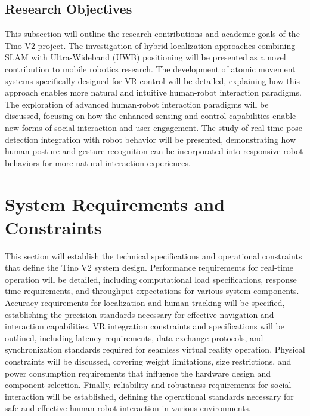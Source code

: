 \subsection{Research Objectives}
This subsection will outline the research contributions and academic goals of the Tino V2 project. The investigation of hybrid localization approaches combining SLAM with Ultra-Wideband (UWB) positioning will be presented as a novel contribution to mobile robotics research. The development of atomic movement systems specifically designed for VR control will be detailed, explaining how this approach enables more natural and intuitive human-robot interaction paradigms. The exploration of advanced human-robot interaction paradigms will be discussed, focusing on how the enhanced sensing and control capabilities enable new forms of social interaction and user engagement. The study of real-time pose detection integration with robot behavior will be presented, demonstrating how human posture and gesture recognition can be incorporated into responsive robot behaviors for more natural interaction experiences.

\section{System Requirements and Constraints}
This section will establish the technical specifications and operational constraints that define the Tino V2 system design. Performance requirements for real-time operation will be detailed, including computational load specifications, response time requirements, and throughput expectations for various system components. Accuracy requirements for localization and human tracking will be specified, establishing the precision standards necessary for effective navigation and interaction capabilities. VR integration constraints and specifications will be outlined, including latency requirements, data exchange protocols, and synchronization standards required for seamless virtual reality operation. Physical constraints will be discussed, covering weight limitations, size restrictions, and power consumption requirements that influence the hardware design and component selection. Finally, reliability and robustness requirements for social interaction will be established, defining the operational standards necessary for safe and effective human-robot interaction in various environments.

